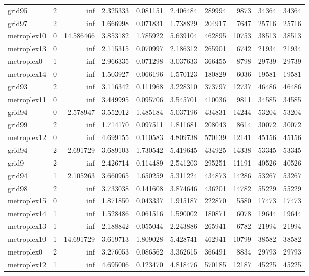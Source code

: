 \begin{longtable}{|l|r|r|r|r|r|r|r|r|r|}
grid95 & 2 & inf & 2.325333 & 0.081151 & 2.406484 & 289994 & 9873 & 34364 & 34364 \\
grid97 & 2 & inf & 1.666998 & 0.071831 & 1.738829 & 204917 & 7647 & 25716 & 25716 \\
metroplex10 & 0 & 14.586466 & 3.853182 & 1.785922 & 5.639104 & 462895 & 10753 & 38513 & 38513 \\
metroplex13 & 0 & inf & 2.115315 & 0.070997 & 2.186312 & 265901 & 6742 & 21934 & 21934 \\
metroplex0 & 1 & inf & 2.966335 & 0.071298 & 3.037633 & 366455 & 8798 & 29739 & 29739 \\
metroplex14 & 0 & inf & 1.503927 & 0.066196 & 1.570123 & 180829 & 6036 & 19581 & 19581 \\
grid93 & 2 & inf & 3.116342 & 0.111968 & 3.228310 & 373797 & 12737 & 46486 & 46486 \\
metroplex11 & 0 & inf & 3.449995 & 0.095706 & 3.545701 & 410036 & 9811 & 34585 & 34585 \\
grid94 & 0 & 2.578947 & 3.552012 & 1.485184 & 5.037196 & 434831 & 14244 & 53204 & 53204 \\
grid99 & 2 & inf & 1.714170 & 0.097511 & 1.811681 & 208043 & 8614 & 30072 & 30072 \\
metroplex12 & 0 & inf & 4.699155 & 0.110583 & 4.809738 & 570139 & 12141 & 45156 & 45156 \\
grid94 & 2 & 2.691729 & 3.689103 & 1.730542 & 5.419645 & 434925 & 14338 & 53345 & 53345 \\
grid9 & 2 & inf & 2.426714 & 0.114489 & 2.541203 & 295251 & 11191 & 40526 & 40526 \\
grid94 & 1 & 2.105263 & 3.660965 & 1.650259 & 5.311224 & 434873 & 14286 & 53267 & 53267 \\
grid98 & 2 & inf & 3.733038 & 0.141608 & 3.874646 & 436201 & 14782 & 55229 & 55229 \\
metroplex15 & 0 & inf & 1.871850 & 0.043337 & 1.915187 & 222870 & 5580 & 17473 & 17473 \\
metroplex14 & 1 & inf & 1.528486 & 0.061516 & 1.590002 & 180871 & 6078 & 19644 & 19644 \\
metroplex13 & 1 & inf & 2.188842 & 0.055044 & 2.243886 & 265941 & 6782 & 21994 & 21994 \\
metroplex10 & 1 & 14.691729 & 3.619713 & 1.809028 & 5.428741 & 462941 & 10799 & 38582 & 38582 \\
metroplex0 & 2 & inf & 3.276053 & 0.086562 & 3.362615 & 366491 & 8834 & 29793 & 29793 \\
metroplex12 & 1 & inf & 4.695006 & 0.123470 & 4.818476 & 570185 & 12187 & 45225 & 45225 \\

\end{longtable}
